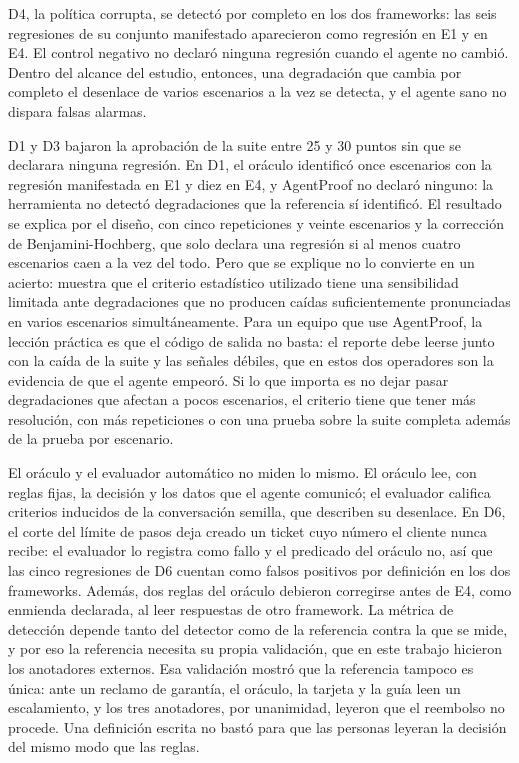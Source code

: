  D4, la política corrupta, se detectó por completo en los dos frameworks: las seis regresiones de su conjunto manifestado aparecieron como regresión en E1 y en E4. El control negativo no declaró ninguna regresión cuando el agente no cambió. Dentro del alcance del estudio, entonces, una degradación que cambia por completo el desenlace de varios escenarios a la vez se detecta, y el agente sano no dispara falsas alarmas.
\par
{} D1 y D3 bajaron la aprobación de la suite entre 25 y 30 puntos sin que se declarara ninguna regresión. En D1, el oráculo identificó once escenarios con la regresión manifestada en E1 y diez en E4, y AgentProof no declaró ninguno: la herramienta no detectó degradaciones que la referencia sí identificó. El resultado se explica por el diseño, con cinco repeticiones y veinte escenarios y la corrección de Benjamini-Hochberg, que solo declara una regresión si al menos cuatro escenarios caen a la vez del todo. Pero que se explique no lo convierte en un acierto: muestra que el criterio estadístico utilizado tiene una sensibilidad limitada ante degradaciones que no producen caídas suficientemente pronunciadas en varios escenarios simultáneamente. Para un equipo que use AgentProof, la lección práctica es que el código de salida no basta: el reporte debe leerse junto con la caída de la suite y las señales débiles, que en estos dos operadores son la evidencia de que el agente empeoró. Si lo que importa es no dejar pasar degradaciones que afectan a pocos escenarios, el criterio tiene que tener más resolución, con más repeticiones o con una prueba sobre la suite completa además de la prueba por escenario.
\par
{} El oráculo y el evaluador automático no miden lo mismo. El oráculo lee, con reglas fijas, la decisión y los datos que el agente comunicó; el evaluador califica criterios inducidos de la conversación semilla, que describen su desenlace. En D6, el corte del límite de pasos deja creado un ticket cuyo número el cliente nunca recibe: el evaluador lo registra como fallo y el predicado del oráculo no, así que las cinco regresiones de D6 cuentan como falsos positivos por definición en los dos frameworks. Además, dos reglas del oráculo debieron corregirse antes de E4, como enmienda declarada, al leer respuestas de otro framework. La métrica de detección depende tanto del detector como de la referencia contra la que se mide, y por eso la referencia necesita su propia validación, que en este trabajo hicieron los anotadores externos. Esa validación mostró que la referencia tampoco es única: ante un reclamo de garantía, el oráculo, la tarjeta y la guía leen un escalamiento, y los tres anotadores, por unanimidad, leyeron que el reembolso no procede. Una definición escrita no bastó para que las personas leyeran la decisión del mismo modo que las reglas.
